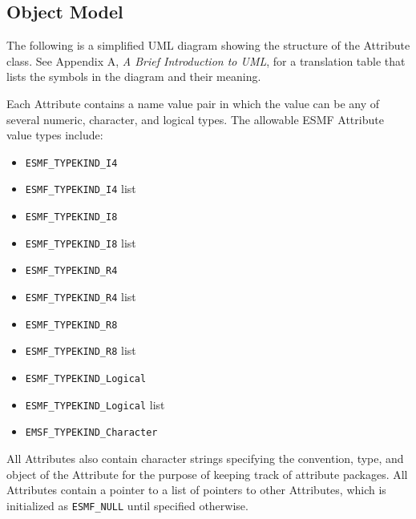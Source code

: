 %

\subsection{Object Model}

The following is a simplified UML diagram showing the structure of the
Attribute class.  See Appendix A, {\it A Brief Introduction to UML},
for a translation table that lists the symbols in the diagram and their 
meaning.


Each Attribute contains a name value pair in which the value can be any of several numeric, character, and logical types.  The allowable ESMF Attribute value types include:

\begin{itemize}
\item {\tt ESMF_TYPEKIND_I4}
\item {\tt ESMF_TYPEKIND_I4} list
\item {\tt ESMF_TYPEKIND_I8}
\item {\tt ESMF_TYPEKIND_I8} list
\item {\tt ESMF_TYPEKIND_R4}
\item {\tt ESMF_TYPEKIND_R4} list
\item {\tt ESMF_TYPEKIND_R8}
\item {\tt ESMF_TYPEKIND_R8} list
\item {\tt ESMF_TYPEKIND_Logical}
\item {\tt ESMF_TYPEKIND_Logical} list
\item {\tt EMSF_TYPEKIND_Character}
\end{itemize}

All Attributes also contain character strings specifying the convention, type, and object of the Attribute for the purpose of keeping track of attribute packages.  All Attributes contain a pointer to a list of pointers to other Attributes, which is initialized as {\tt ESMF_NULL} until specified otherwise.